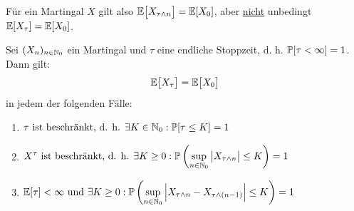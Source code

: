 \begin{bemerkung}
Für ein Martingal $X$ gilt also $\E\big[X_{\tau\wedge n}\big]=\E[X_0]$, aber \ul{nicht} unbedingt $\E[X_\tau]=\E[X_0]$.
\end{bemerkung}

\begin{theorem}\enter\label{theorem3.3}
Sei $(X_n)_{n\in\N_0}$ ein Martingal und $\tau$ eine endliche Stoppzeit, d. h. $\P[\tau<\infty]=1$. Dann gilt:
\begin{align}\label{eqTheorem3.3}
\E\big[X_\tau\big]=\E\big[X_0\big]
\end{align}
in jedem der folgenden Fälle:
\begin{enumerate}[label=\alph*)]
\item $\begin{aligned}
\tau\text{ ist beschränkt, d. h. }\exists K\in\N_0:\P[\tau\leq K]=1
\end{aligned}$
\item $
\begin{aligned}
X^\tau\text{ ist beschränkt, d. h. }\exists K\geq0:\P\left(\sup\limits_{n\in\N_0}\big| X_{\tau\wedge n}\big|\leq K\right)=1
\end{aligned}$
\item $\begin{aligned}
\E[\tau]<\infty\text{ und }\exists K\geq0:\P\left(\sup\limits_{n\in\N_0}\Big|X_{\tau\wedge n}-X_{\tau\wedge(n-1)}\Big|\leq K\right)=1
\end{aligned}$
\end{enumerate}
\end{theorem}
